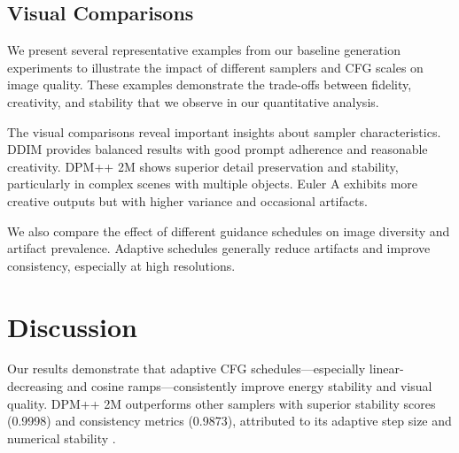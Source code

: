 \documentclass[10pt,twocolumn]{article}
\begin{document}
\subsection{Visual Comparisons}
We present several representative examples from our baseline generation experiments to illustrate the impact of different samplers and CFG scales on image quality. These examples demonstrate the trade-offs between fidelity, creativity, and stability that we observe in our quantitative analysis.

The visual comparisons reveal important insights about sampler characteristics. DDIM provides balanced results with good prompt adherence and reasonable creativity. DPM++ 2M shows superior detail preservation and stability, particularly in complex scenes with multiple objects. Euler A exhibits more creative outputs but with higher variance and occasional artifacts.

We also compare the effect of different guidance schedules on image diversity and artifact prevalence. Adaptive schedules generally reduce artifacts and improve consistency, especially at high resolutions.


\section{Discussion}
Our results demonstrate that adaptive CFG schedules---especially linear-decreasing and cosine ramps---consistently improve energy stability and visual quality. DPM++ 2M outperforms other samplers with superior stability scores (0.9998) and consistency metrics (0.9873), attributed to its adaptive step size and numerical stability \cite{nichol2021improved,bao2022analytic}.

\begin{table}[H]
\centering
\footnotesize %
\caption{Quantitative comparison (top configs and baselines). Metrics are averaged over 10 prompts. HiResFix/RectifiedFlow numbers are from their original papers and may not be directly comparable.}
\label{tab:quantitative}
\end{table}
\end{document}
